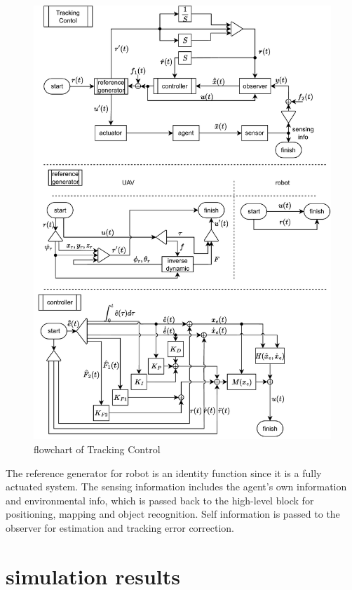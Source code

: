 \documentclass{ieeeaccess}
\begin{document}
\begin{figure}[htbp]
    \centering
    \includegraphics[scale=.5]{fig/tracking.pdf}\caption{flowchart of Tracking Control}%
    \label{fig:tracking}
\end{figure}

The reference generator for robot is an identity function since it is a fully actuated system. The sensing information includes the agent's own information and environmental info, which is passed back to the high-level block for positioning, mapping and object recognition. Self information is passed to the observer for estimation and tracking error correction.

\section{simulation results}
\end{document}
